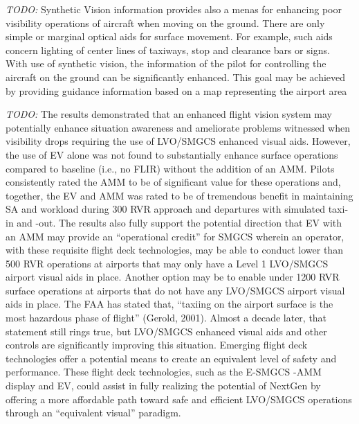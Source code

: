 \documentclass[utf8,bachelor,manualbib]{gradu3}
\begin{document}
\emph{TODO:}
Synthetic Vision information provides also a menas for enhancing poor visibility operations of aircraft when moving on the ground. There are only simple or marginal optical aids for surface movement.
For example, such aids concern lighting of center lines of
taxiways, stop and clearance bars or signs.
With use of synthetic vision, the information of the pilot for
controlling the aircraft on the ground can be significantly
enhanced. This goal may be achieved by providing guidance
information based on a map representing the airport area \citep{mollersachs1994} 

\emph{TODO:}
The results demonstrated that an enhanced flight vision system may potentially enhance situation awareness and ameliorate problems witnessed when visibility drops requiring the use of LVO/SMGCS enhanced visual aids. However, the use of EV alone was not found to substantially enhance surface operations compared to baseline (i.e., no FLIR) without the addition of an AMM. Pilots consistently rated the AMM to be of significant value for these operations and, together, the EV and AMM was rated to be of tremendous benefit in maintaining SA and workload during 300 RVR approach and departures with simulated taxi-in and -out. The results also fully support the potential direction that EV with an AMM may provide an “operational credit” for SMGCS wherein an operator, with these requisite flight deck technologies, may be able to conduct lower than 500 RVR operations at airports that may only have a Level 1 LVO/SMGCS airport visual aids in place. Another option may be to enable under 1200 RVR surface operations at airports that do not have any LVO/SMGCS airport visual aids in place.
The FAA has stated that, “taxiing on the airport surface is the most hazardous phase of flight” (Gerold, 2001). Almost a decade later, that statement still rings true, but LVO/SMGCS enhanced visual aids and other controls are significantly improving this situation. Emerging flight deck technologies offer a potential means to create an equivalent level of safety and performance. These flight deck technologies, such as the E-SMGCS -AMM display and EV, could assist in fully realizing the potential of NextGen by offering a more affordable path toward safe and efficient LVO/SMGCS operations through an “equivalent visual” paradigm.\citep{prinzel2013}
\end{document}
